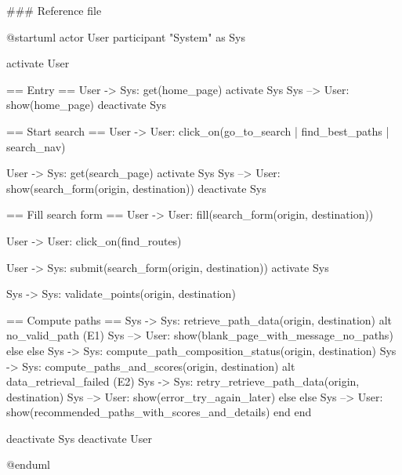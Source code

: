 ### Reference file 

@startuml
actor User
participant "System" as Sys

activate User

== Entry ==
User -> Sys: get(home_page)
activate Sys
Sys --> User: show(home_page)
deactivate Sys

== Start search ==
User -> User: click_on(go_to_search | find_best_paths | search_nav)

User -> Sys: get(search_page)
activate Sys
Sys --> User: show(search_form(origin, destination))
deactivate Sys

== Fill search form ==
User -> User: fill(search_form(origin, destination))

User -> User: click_on(find_routes)

User -> Sys: submit(search_form(origin, destination))
activate Sys

Sys -> Sys: validate_points(origin, destination)

== Compute paths ==
Sys -> Sys: retrieve_path_data(origin, destination)
alt no_valid_path (E1)
    Sys --> User: show(blank_page_with_message_no_paths)
else else
    Sys -> Sys: compute_path_composition_status(origin, destination)
    Sys -> Sys: compute_paths_and_scores(origin, destination)
    alt data_retrieval_failed (E2)
        Sys -> Sys: retry_retrieve_path_data(origin, destination)
        Sys --> User: show(error_try_again_later)
    else else
        Sys --> User: show(recommended_paths_with_scores_and_details)
    end
end

deactivate Sys
deactivate User

@enduml